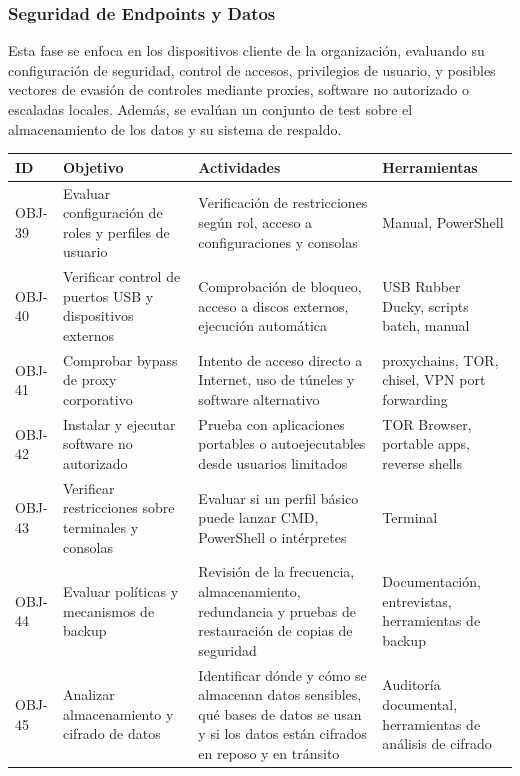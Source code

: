 \documentclass[a4paper, 10pt]{article}
\begin{document}
\subsubsection{Seguridad de Endpoints y Datos}

Esta fase se enfoca en los dispositivos cliente de la organización, evaluando su configuración de seguridad, control de accesos, privilegios de usuario, y posibles vectores de evasión de controles mediante proxies, software no autorizado o escaladas locales.
Además, se evalúan un conjunto de test sobre el almacenamiento de los datos y su sistema de respaldo.

\begin{table}[H]
\centering
\renewcommand{\arraystretch}{1.4}
\begin{tabular}{|p{1.2cm}|p{4.2cm}|p{4.8cm}|p{3.8cm}|}
\hline
\textbf{ID} & \textbf{Objetivo} & \textbf{Actividades} & \textbf{Herramientas}  \\
\hline
OBJ-39 & Evaluar configuración de roles y perfiles de usuario & Verificación de restricciones según rol, acceso a configuraciones y consolas & Manual, PowerShell  \\
\hline
OBJ-40 & Verificar control de puertos USB y dispositivos externos & Comprobación de bloqueo, acceso a discos externos, ejecución automática & USB Rubber Ducky, scripts batch, manual  \\
\hline
OBJ-41 & Comprobar bypass de proxy corporativo & Intento de acceso directo a Internet, uso de túneles y software alternativo & proxychains, TOR, chisel, VPN port forwarding  \\
\hline
OBJ-42 & Instalar y ejecutar software no autorizado & Prueba con aplicaciones portables o autoejecutables desde usuarios limitados & TOR Browser, portable apps, reverse shells  \\
\hline
OBJ-43 & Verificar restricciones sobre terminales y consolas & Evaluar si un perfil básico puede lanzar CMD, PowerShell o intérpretes & Terminal  \\
\hline
OBJ-44 & Evaluar políticas y mecanismos de backup & Revisión de la frecuencia, almacenamiento, redundancia y pruebas de restauración de copias de seguridad & Documentación, entrevistas, herramientas de backup \\
\hline
OBJ-45 & Analizar almacenamiento y cifrado de datos & Identificar dónde y cómo se almacenan datos sensibles, qué bases de datos se usan y si los datos están cifrados en reposo y en tránsito & Auditoría documental, herramientas de análisis de cifrado \\

\end{tabular}
\end{table}
\end{document}
